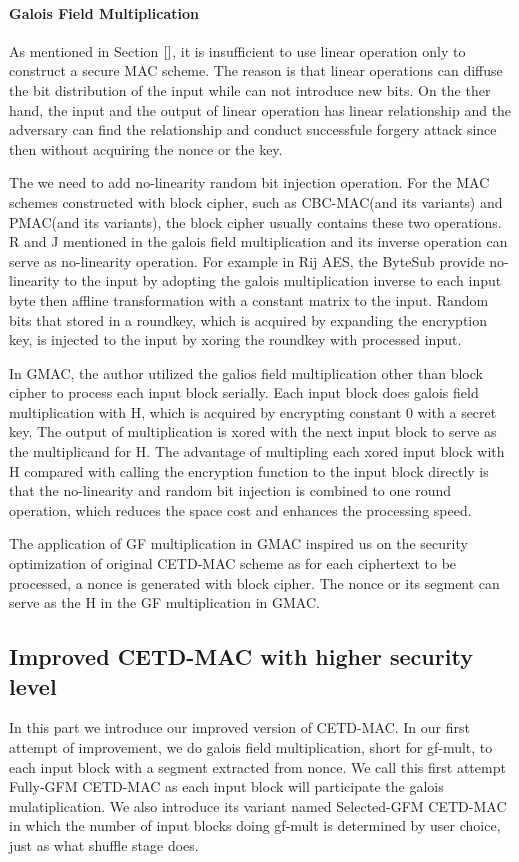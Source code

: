 \documentclass{article}
\begin{document}
\paragraph{Galois Field Multiplication}
As mentioned in Section $\ref{}$, it is insufficient to use linear operation
only to construct a secure MAC scheme. The reason is that linear operations can
diffuse the bit distribution of the input while can not introduce new bits. On
the ther hand, the input and the output of linear operation has linear
relationship and the adversary can find the relationship and conduct successfule
forgery attack since then without acquiring the nonce or the key.

The we need to add no-linearity random bit injection operation. For the MAC
schemes constructed with block cipher, such as CBC-MAC(and its variants) and
PMAC(and its variants), the block cipher usually contains these two operations.
R and J mentioned in \cite{} the galois field multiplication and its inverse
operation can serve as no-linearity operation. 
For example in Rij AES, the ByteSub provide no-linearity to the input by
adopting the galois multiplication inverse to each input byte then affline
transformation with a constant matrix to the input. Random bits that stored in a
roundkey, which is acquired by expanding the encryption key, is injected to the
input by xoring the roundkey with processed input.  

In GMAC, the author utilized the galios field multiplication other than block
cipher to process each input block serially. Each input block does galois field
multiplication with H, which is acquired by encrypting constant 0 with a secret
key. The output of multiplication is xored with the next input block to serve as
the multiplicand for H. The advantage of multipling each xored input block with
H compared with calling the encryption function to the input block directly is
that the no-linearity and random bit injection is combined to one round
operation, which reduces the space cost and enhances the processing speed.

The application of GF multiplication in GMAC inspired us on the security
optimization of original CETD-MAC scheme as for each ciphertext to be processed,
a nonce is generated with block cipher. The nonce or its segment can serve as
the H in the GF multiplication in GMAC. 
\subsection{Improved CETD-MAC with higher security level}
In this part we introduce our improved version of CETD-MAC. In our first attempt
of improvement, we do galois field multiplication, short for gf-mult, to each input block with a
segment extracted from nonce. We call this first attempt Fully-GFM CETD-MAC as
each input block will participate the galois mulatiplication. We also introduce
its variant named Selected-GFM CETD-MAC in which the number of input blocks
doing gf-mult is determined by user choice, just as what shuffle stage does. 
\end{document}
